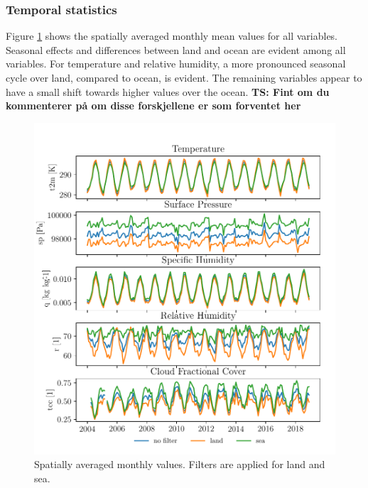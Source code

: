 \subsubsection{Temporal statistics}
Figure \ref{fig:monthly_mean_ts_vars} shows the spatially averaged monthly mean values for all variables. Seasonal effects and differences between land and ocean are evident among all variables. For temperature and relative humidity, a more pronounced seasonal cycle over land, compared to ocean, is evident. The remaining variables appear to have a small shift towards higher values over the ocean. \textbf{TS: Fint om du kommenterer på om disse forskjellene er som forventet her}
\begin{figure}[ht]
    \centering
    \includegraphics{python_figs/monthly_means.pdf}
    \caption{Spatially averaged monthly values. Filters are applied for land and sea.}
    \label{fig:monthly_mean_ts_vars}
\end{figure}

